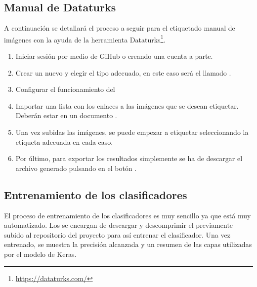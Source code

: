 \subsection{Manual de Dataturks}

A continuación se detallará el proceso a seguir para el etiquetado manual de imágenes con la ayuda de la herramienta Dataturks\footnote{\url{https://dataturks.com/}}.

\begin{enumerate}
    \item Iniciar sesión por medio de GiHub o creando una cuenta a parte.
    \item Crear un nuevo  y elegir el tipo adecuado, en este caso será el llamado .
    
    
    \item Configurar el funcionamiento del 
    
    
    \item Importar una lista con los enlaces a las imágenes que se desean etiquetar. Deberán estar en un documento .
    
    \item Una vez subidas las imágenes, se puede empezar a etiquetar seleccionando la etiqueta adecuada en cada caso.
    
    
    \item Por último, para exportar los resultados simplemente se ha de descargar el archivo generado pulsando en el botón .
    
\end{enumerate}

\subsection{Entrenamiento de los clasificadores}

El proceso de entrenamiento de los clasificadores es muy sencillo ya que está muy automatizado. Los  se encargan de descargar y descomprimir el  previamente subido al repositorio del proyecto para así entrenar el clasificador. Una vez entrenado, se muestra la precisión alcanzada y un resumen de las capas utilizadas por el modelo de Keras.

